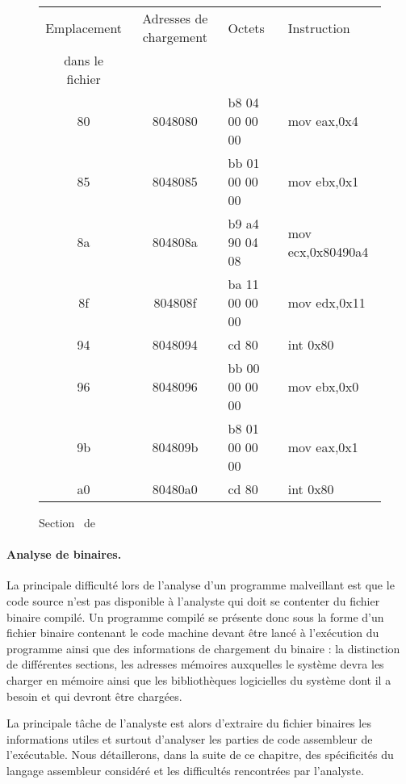 \begin{figure}[h]
\begin{center}
\begin{tabular}{|c|c|l|l|}
\hline
Emplacement & Adresses de chargement & Octets & Instruction\\ 
dans le fichier & &  & \\ 
\hline
80 & 8048080 & b8 04 00 00 00 & mov    eax,0x4       \\
85 & 8048085 & bb 01 00 00 00 & mov    ebx,0x1       \\
8a & 804808a & b9 a4 90 04 08 & mov    ecx,0x80490a4 \\
8f & 804808f & ba 11 00 00 00 & mov    edx,0x11      \\
94 & 8048094 & cd 80          & int    0x80          \\
96 & 8048096 & bb 00 00 00 00 & mov    ebx,0x0       \\
9b & 804809b & b8 01 00 00 00 & mov    eax,0x1       \\
a0 & 80480a0 & cd 80          & int    0x80          \\
\hline
\end{tabular}
\end{center}
\caption{Section \ptext\ de \helloworld}
\label{fig:text_helloworld}
\end{figure}


\paragraph{Analyse de binaires.}
La principale difficulté lors de l'analyse d'un programme malveillant est que le code source n'est pas disponible à l'analyste qui doit se contenter du fichier binaire compilé.
Un programme compilé se présente donc sous la forme d'un fichier binaire contenant le code machine devant être lancé à l'exécution du programme ainsi que des informations de chargement du binaire : la distinction de différentes sections, les adresses mémoires auxquelles le système devra les charger en mémoire ainsi que les bibliothèques logicielles du système dont il a besoin et qui devront être chargées.

La principale tâche de l'analyste est alors d'extraire du fichier binaires les informations utiles et surtout d'analyser les parties de code assembleur de l'exécutable. Nous détaillerons, dans la suite de ce chapitre, des spécificités du langage assembleur considéré et les difficultés rencontrées par l'analyste.

\label{section:assembleur}
